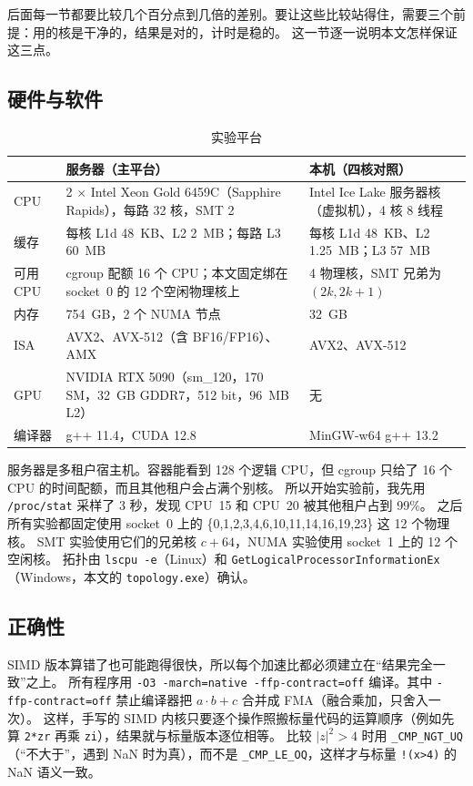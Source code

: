 \documentclass[11pt,a4paper]{ctexart}
\begin{document}
后面每一节都要比较几个百分点到几倍的差别。要让这些比较站得住，需要三个前提：用的核是干净的，结果是对的，计时是稳的。
这一节逐一说明本文怎样保证这三点。

\subsection{硬件与软件}

\begin{table}[H]
\centering
\caption{实验平台}
\label{tab:platform}
\small
\begin{tabularx}{\linewidth}{lXX}
\toprule
 & 服务器（主平台） & 本机（四核对照） \\
\midrule
CPU & 2 $\times$ Intel Xeon Gold 6459C（Sapphire Rapids），每路 32 核，SMT 2 & Intel Ice Lake 服务器核（虚拟机），4 核 8 线程 \\
缓存 & 每核 L1d 48~KB、L2 2~MB；每路 L3 60~MB & 每核 L1d 48~KB、L2 1.25~MB；L3 57~MB \\
可用 CPU & cgroup 配额 16 个 CPU；本文固定绑在 socket~0 的 12 个空闲物理核上 & 4 物理核，SMT 兄弟为 $(2k, 2k{+}1)$ \\
内存 & 754~GB，2 个 NUMA 节点 & 32~GB \\
ISA & AVX2、AVX-512（含 BF16/FP16）、AMX & AVX2、AVX-512 \\
GPU & NVIDIA RTX 5090（sm\_120，170 SM，32~GB GDDR7，512 bit，96~MB L2） & 无 \\
编译器 & g++ 11.4，CUDA 12.8 & MinGW-w64 g++ 13.2 \\
\bottomrule
\end{tabularx}
\end{table}

服务器是多租户宿主机。容器能看到 128 个逻辑 CPU，但 cgroup 只给了 16 个 CPU 的时间配额，而且其他租户会占满个别核。
所以开始实验前，我先用 \texttt{/proc/stat} 采样了 3 秒，发现 CPU~15 和 CPU~20 被其他租户占到 99\%。
之后所有实验都固定使用 socket~0 上的 \{0,1,2,3,4,6,10,11,14,16,19,23\} 这 12 个物理核。
SMT 实验使用它们的兄弟核 $c{+}64$，NUMA 实验使用 socket~1 上的 12 个空闲核。
拓扑由 \texttt{lscpu -e}（Linux）和 \texttt{GetLogicalProcessorInformationEx}（Windows，本文的 \texttt{topology.exe}）确认。

\subsection{正确性}

SIMD 版本算错了也可能跑得很快，所以每个加速比都必须建立在``结果完全一致''之上。
所有程序用 \texttt{-O3 -march=native -ffp-contract=off} 编译。其中 \texttt{-ffp-contract=off} 禁止编译器把 $a\cdot b+c$ 合并成 FMA（融合乘加，只舍入一次）。
这样，手写的 SIMD 内核只要逐个操作照搬标量代码的运算顺序（例如先算 \texttt{2*zr} 再乘 \texttt{zi}），结果就与标量版本逐位相等。
比较 $|z|^2>4$ 时用 \texttt{\_CMP\_NGT\_UQ}（``不大于''，遇到 NaN 时为真），而不是 \texttt{\_CMP\_LE\_OQ}，这样才与标量 \texttt{!(x>4)} 的 NaN 语义一致。
\end{document}
